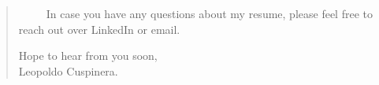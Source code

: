 \documentclass[letterpaper,11pt]{article}
\newcommand{\ind}{~~~~~}
\begin{document}
{\begin{quote}
\ind In case you have any questions about my resume, please feel free to reach out over LinkedIn or email.

\begin{FlushRight}
Hope to hear from you soon,\\
Leopoldo Cuspinera.
\end{FlushRight}


\end{quote}
}
% 

\end{document}
